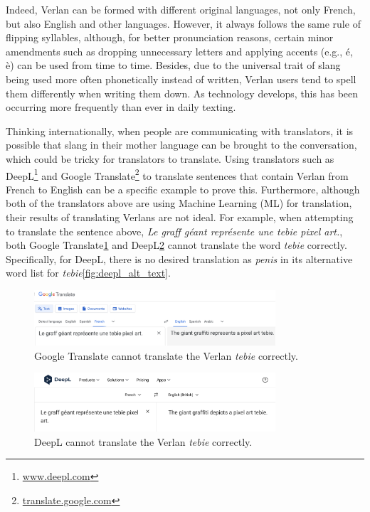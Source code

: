 \documentclass[12pt]{article}
\begin{document}
Indeed, Verlan can be formed with different original languages, not only French, but also English and other languages. However, it always follows the same rule of flipping syllables, although, for better pronunciation reasons, certain minor amendments such as dropping unnecessary letters and applying accents (e.g., é, è) can be used from time to time\cite{rajabov2025}. Besides, due to the universal trait of slang being used more often phonetically instead of written, Verlan users tend to spell them differently when writing them down. As technology develops, this has been occurring more frequently than ever in daily texting\cite{rua2005}.

Thinking internationally, when people are communicating with translators, it is possible that slang in their mother language can be brought to the conversation, which could be tricky for translators to translate\cite{hajiyeva2025}. Using translators such as DeepL\footnote{\url{www.deepl.com}} and Google Translate\footnote{\url{translate.google.com}} to translate sentences that contain Verlan from French to English can be a specific example to prove this. Furthermore, although both of the translators above are using Machine Learning (ML) for translation, their results of translating Verlans are not ideal\cite{deepl2020, wu2016}. For example, when attempting to translate the sentence above, \textit{Le graff géant représente une tebie pixel art.}, both Google Translate\ref{fig:google_Verlan} and DeepL\ref{fig:deepl_Verlan} cannot translate the word \textit{tebie} correctly. Specifically, for DeepL, there is no desired translation as \textit{penis} in its alternative word list for \textit{tebie}\ref{fig:deepl_alt_text}.

\begin{figure}[H]
\centering
\includegraphics[width=0.8\textwidth]{figures/google_Verlan.png}
\caption{\label{fig:google_Verlan}Google Translate cannot translate the Verlan \textit{tebie} correctly.}
\end{figure}

\begin{figure}[H]
\centering
\includegraphics[width=0.8\textwidth]{figures/deepl_Verlan.png}
\caption{\label{fig:deepl_Verlan}DeepL cannot translate the Verlan \textit{tebie} correctly.}
\end{figure}
\end{document}
